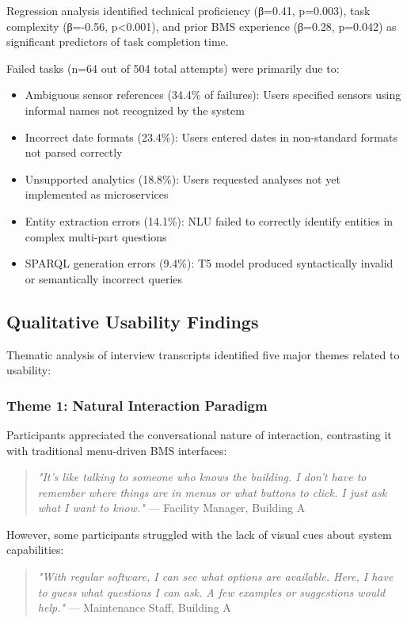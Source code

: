 \documentclass[acmlarge]{acmart}
\begin{document}
Regression analysis identified technical proficiency (β=0.41, p=0.003), task complexity (β=-0.56, p<0.001), and prior BMS experience (β=0.28, p=0.042) as significant predictors of task completion time.

Failed tasks (n=64 out of 504 total attempts) were primarily due to:
\begin{itemize}
    \item Ambiguous sensor references (34.4\% of failures): Users specified sensors using informal names not recognized by the system
    \item Incorrect date formats (23.4\%): Users entered dates in non-standard formats not parsed correctly
    \item Unsupported analytics (18.8\%): Users requested analyses not yet implemented as microservices
    \item Entity extraction errors (14.1\%): NLU failed to correctly identify entities in complex multi-part questions
    \item SPARQL generation errors (9.4\%): T5 model produced syntactically invalid or semantically incorrect queries
\end{itemize}

\subsection{Qualitative Usability Findings}

Thematic analysis of interview transcripts identified five major themes related to usability:

\subsubsection{Theme 1: Natural Interaction Paradigm}

Participants appreciated the conversational nature of interaction, contrasting it with traditional menu-driven BMS interfaces:

\begin{quote}
\textit{"It's like talking to someone who knows the building. I don't have to remember where things are in menus or what buttons to click. I just ask what I want to know."} — Facility Manager, Building A
\end{quote}

However, some participants struggled with the lack of visual cues about system capabilities:

\begin{quote}
\textit{"With regular software, I can see what options are available. Here, I have to guess what questions I can ask. A few examples or suggestions would help."} — Maintenance Staff, Building A
\end{quote}
\end{document}
